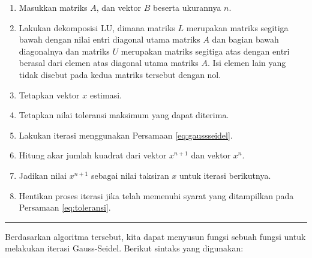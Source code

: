 \documentclass[]{book}
\providecommand{\tightlist}{%
  \setlength{\itemsep}{0pt}\setlength{\parskip}{0pt}}
\theoremstyle{definition}
\theoremstyle{definition}
\theoremstyle{definition}
\theoremstyle{remark}
\begin{document}
\begin{enumerate}
\def\labelenumi{\arabic{enumi}.}
\tightlist
\item
  Masukkan matriks \(A\), dan vektor \(B\) beserta ukurannya \(n\).
\item
  Lakukan dekomposisi LU, dimana matriks \(L\) merupakan matriks segitiga bawah dengan nilai entri diagonal utama matriks \(A\) dan bagian bawah diagonalnya dan matriks \(U\) merupakan matriks segitiga atas dengan entri berasal dari elemen atas diagonal utama matriks \(A\). Isi elemen lain yang tidak disebut pada kedua matriks tersebut dengan nol.
\item
  Tetapkan vektor \(x\) estimasi.
\item
  Tetapkan nilai toleransi maksimum yang dapat diterima.
\item
  Lakukan iterasi menggunakan Persamaan \eqref{eq:gaussseidel}.
\item
  Hitung akar jumlah kuadrat dari vektor \(x^{n+1}\) dan vektor \(x^n\).
\item
  Jadikan nilai \(x^{n+1}\) sebagai nilai taksiran \(x\) untuk iterasi berikutnya.
\item
  Hentikan proses iterasi jika telah memenuhi syarat yang ditampilkan pada Persamaan \eqref{eq:toleransi}.
\end{enumerate}

\begin{center}\rule{0.5\linewidth}{\linethickness}\end{center}

Berdasarkan algoritma tersebut, kita dapat menyusun fungsi sebuah fungsi untuk melakukan iterasi Gauss-Seidel. Berikut sintaks yang digunakan:
\end{document}
